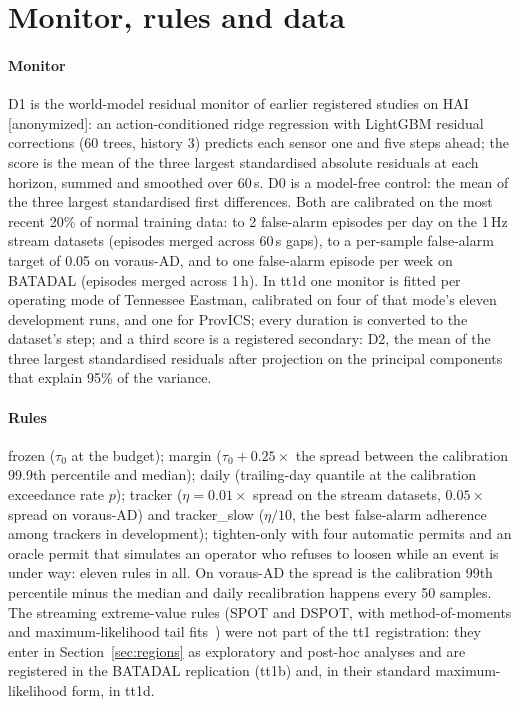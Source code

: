 \documentclass[sigconf,review,anonymous]{acmart}
\begin{document}
\section{Monitor, rules and data}
\label{sec:setup}

\paragraph{Monitor}
D1 is the world-model residual monitor of earlier registered studies on HAI [anonymized]: an
action-conditioned ridge regression with LightGBM residual corrections (60 trees, history 3)
predicts each sensor one and five steps ahead; the score is the mean of the three largest
standardised absolute residuals at each horizon, summed and smoothed over 60\,s. D0 is a model-free
control: the mean of the three largest standardised first differences. Both are calibrated on the
most recent 20\% of normal training data: to 2 false-alarm episodes per day on the 1\,Hz stream
datasets (episodes merged across 60\,s gaps), to a per-sample false-alarm target of 0.05 on
voraus-AD, and to one false-alarm episode per week on BATADAL (episodes merged across 1\,h). In tt1d
one monitor is fitted per operating mode of Tennessee Eastman, calibrated on four of that mode's eleven
development runs, and one for ProvICS; every duration is converted to the dataset's step; and a third
score is a registered secondary: D2, the mean of the three largest standardised residuals after
projection on the principal components that explain 95\% of the variance.

\paragraph{Rules}
frozen ($\tau_0$ at the budget); margin ($\tau_0 + 0.25 \times$ the spread between the calibration
99.9th percentile and median); daily (trailing-day quantile at the calibration exceedance rate $p$);
tracker ($\eta = 0.01 \times$ spread on the stream datasets, $0.05 \times$ spread on voraus-AD) and
tracker\_slow ($\eta / 10$, the best false-alarm adherence among trackers in development);
tighten-only with four automatic permits and an oracle permit that simulates an operator who refuses
to loosen while an event is under way: eleven rules in all. On voraus-AD the spread is the
calibration 99th percentile minus the median and daily recalibration happens every 50 samples. The
streaming extreme-value rules (SPOT and DSPOT, with method-of-moments and maximum-likelihood tail
fits~\cite{hosking1987gpd, siffer2017spot}) were not part of the tt1 registration: they enter in
Section~\ref{sec:regions} as exploratory and post-hoc analyses and are registered in the BATADAL
replication (tt1b) and, in their standard maximum-likelihood form, in tt1d.
\end{document}
